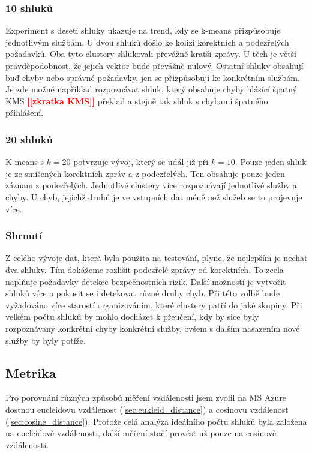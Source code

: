 \documentclass[thesis=M,czech]{FITthesis}[2012/10/20]
\newcommand{\todo}[1]{\textcolor{red}{\textbf{[[#1]]}}}
\begin{document}
				\subsubsection{10 shluků}
				Experiment s deseti shluky ukazuje na trend, kdy se k-means přizpůsobuje jednotlivým službám. U dvou shluků došlo ke kolizi korektních a podezřelých požadavků. Oba tyto clustery shlukovali převážně kratší zprávy. U těch je větší pravděpodobnost, že jejich vektor bude převážně nulový. Ostatní shluky obsahují buď chyby nebo správné požadavky, jen se přizpůsobují ke konkrétním službám. Je zde možné například rozpoznávat shluk, který obsahuje chyby hlásící špatný KMS \todo{zkratka KMS} překlad a stejně tak shluk s chybami špatného přihlášení.
				
				\subsubsection{20 shluků}
				K-means s $k = 20$ potvrzuje vývoj, který se udál již při $k = 10$. Pouze jeden shluk je ze smíšených korektních zpráv a z podezřelých. Ten obsahuje pouze jeden záznam z podezřelých. Jednotlivé clustery více rozpoznávají jednotlivé služby a chyby. U chyb, jejichž druhů je ve vstupních dat méně než služeb se to projevuje více.
				
				\subsubsection{Shrnutí}
				Z celého vývoje dat, která byla použita na testování, plyne, že nejlepším je nechat dva shluky. Tím dokážeme rozlišit podezřelé zprávy od korektních. To zcela naplňuje požadavky detekce bezpečnostních rizik. Další možností je vytvořit shluků více a pokusit se i detekovat různé druhy chyb. Při této volbě bude vyžadováno více starostí organizováním, které clustery patří do jaké skupiny. Při velkém počtu shluků by mohlo docházet k přeučení, kdy by sice byly rozpoznávany konkrétní chyby konkrétní služby, ovšem s dalším nasazením nové služby by byly potíže.
		
		\subsection{Metrika}
			Pro porovnání různých způsobů měření vzdálenosti jsem zvolil na MS Azure dostnou eucleidovu vzdálenost (\ref{sec:eukleid_distance}) a cosinovu vzdálenost (\ref{sec:cosine_distance}). Protože celá analýza ideálního počtu shluků byla založena na eucleidově vzdálenosti, další měření stačí provést už pouze na cosinově vzdálenosti.
			
\end{document}
